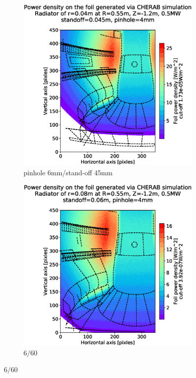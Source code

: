 \begin{figure}
     \centering
     \begin{subfigure}{0.48\linewidth}
         \centering
         \includegraphics[trim={85 25 50 80},clip,width=\textwidth]{Chapters/chapter2/figs/measured_power_4_45radiator_all_core_and_divertor.stl.eps}
         \caption{pinhole 6mm/stand-off 45mm}
         \label{fig:4_45_all}
     \end{subfigure}
     \hfill
     \begin{subfigure}{0.48\linewidth}
         \centering
         \includegraphics[trim={85 25 50 80},clip,width=\textwidth]{Chapters/chapter2/figs/measured_power_4_60radiator_all_core_and_divertor.stl.eps}
         \caption{$6/60$}
         \label{fig:4_60_all}
     \end{subfigure}


\end{figure}
